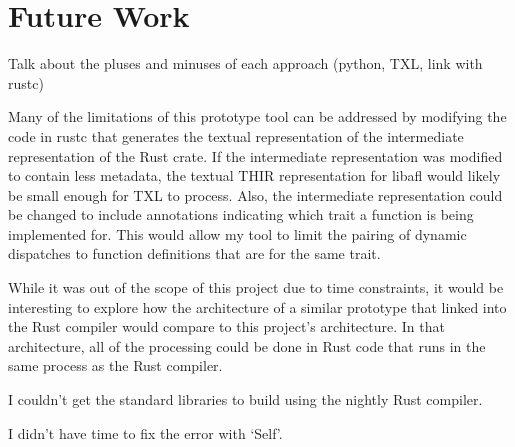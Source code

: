 \documentclass[11pt]{article}
\begin{document}
\section{Future Work}

Talk about the pluses and minuses of each approach (python, TXL, link with rustc)

Many of the limitations of this prototype tool can be addressed by modifying the code in rustc that generates the textual representation of the intermediate representation of the Rust crate.
If the intermediate representation was modified to contain less metadata, the textual THIR representation for libafl would likely be small enough for TXL to process.
Also, the intermediate representation could be changed to include annotations indicating which trait a function is being implemented for.
This would allow my tool to limit the pairing of dynamic dispatches to function definitions that are for the same trait.

While it was out of the scope of this project due to time constraints, it would be interesting to explore how the architecture of a similar prototype that linked into the Rust compiler would compare to this project's architecture.
In that architecture, all of the processing could be done in Rust code that runs in the same process as the Rust compiler.

I couldn't get the standard libraries to build using the nightly Rust compiler.

I didn't have time to fix the error with `Self'.
\end{document}
